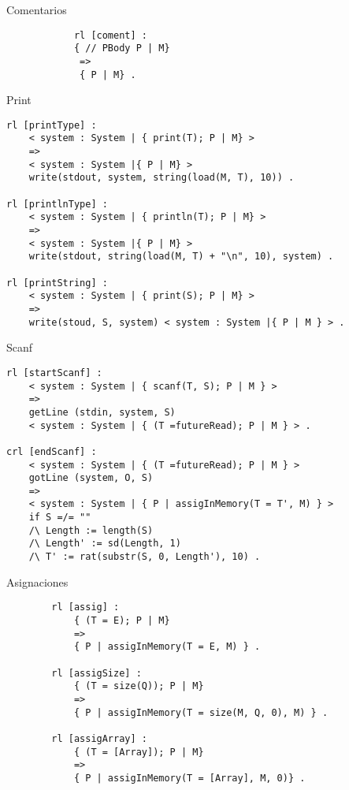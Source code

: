 \documentclass{beamer}
\begin{document}
    \begin{frame}[fragile]{Comentarios}
        \begin{verbatim}  
            rl [coment] :
            { // PBody P | M}
             =>
             { P | M} .
        \end{verbatim}
    \end{frame}

    \begin{frame}[fragile]{Print}
        \begin{verbatim}  
rl [printType] :
    < system : System | { print(T); P | M} >
    => 
    < system : System |{ P | M} > 
    write(stdout, system, string(load(M, T), 10)) .

rl [printlnType] :
    < system : System | { println(T); P | M} >
    => 
    < system : System |{ P | M} > 
    write(stdout, string(load(M, T) + "\n", 10), system) .

rl [printString] :
    < system : System | { print(S); P | M} >
    => 
    write(stoud, S, system) < system : System |{ P | M } > .
        \end{verbatim}
    \end{frame}

    \begin{frame}[fragile]{Scanf}
        \begin{verbatim}  
rl [startScanf] :
    < system : System | { scanf(T, S); P | M } >
    =>
    getLine (stdin, system, S) 
    < system : System | { (T =futureRead); P | M } > .
    
crl [endScanf] :
    < system : System | { (T =futureRead); P | M } > 
    gotLine (system, O, S)
    =>
    < system : System | { P | assigInMemory(T = T', M) } > 
    if S =/= "" 
    /\ Length := length(S)
    /\ Length' := sd(Length, 1)
    /\ T' := rat(substr(S, 0, Length'), 10) .
        \end{verbatim}
    \end{frame}

    \begin{frame}[fragile]{Asignaciones}
        \begin{verbatim}  
        rl [assig] : 
            { (T = E); P | M}
            =>
            { P | assigInMemory(T = E, M) } .

        rl [assigSize] : 
            { (T = size(Q)); P | M}
            =>
            { P | assigInMemory(T = size(M, Q, 0), M) } .
        
        rl [assigArray] :
            { (T = [Array]); P | M}
            =>
            { P | assigInMemory(T = [Array], M, 0)} .
        \end{verbatim}
    \end{frame}
\end{document}
